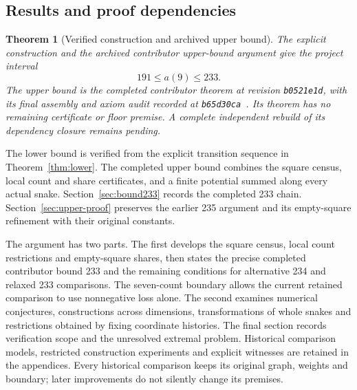 \documentclass[11pt,a4paper]{article}
\newtheorem{theorem}{Theorem}[section]
\theoremstyle{definition}
\theoremstyle{remark}
\begin{document}
\subsection{Results and proof dependencies}
\begin{theorem}[Verified construction and archived upper bound]\label{thm:main}
The explicit construction and the archived contributor upper-bound argument
give the project interval
\[
\boxed{191\le a(9)\le233.}
\]
The upper bound is the completed contributor theorem at revision
\texttt{b0521e1d}, with its final assembly and axiom audit recorded at
\texttt{b65d30ca}~\cite{bound233archive}. Its theorem has no remaining
certificate or floor premise. A complete independent rebuild of its
dependency closure remains pending.
\end{theorem}
The lower bound is verified from the explicit transition sequence in
Theorem~\ref{thm:lower}. The completed upper bound combines the square
census, local count and share certificates, and a finite potential summed
along every actual snake. Section~\ref{sec:bound233} records the completed
233 chain. Section~\ref{sec:upper-proof} preserves the earlier 235 argument
and its empty-square refinement with their original constants.

The argument has two parts. The first develops the square census,
local count restrictions and empty-square shares, then states the precise
completed contributor bound 233 and the remaining conditions for
alternative 234 and relaxed 233 comparisons. The seven-count boundary
allows the current retained comparison to use nonnegative loss alone.
The second examines numerical conjectures, constructions across
dimensions, transformations of whole snakes and restrictions obtained
by fixing coordinate histories. The final section records verification
scope and the unresolved extremal problem. Historical comparison models,
restricted construction experiments and explicit witnesses are retained
in the appendices. Every historical comparison keeps its original graph,
weights and boundary; later improvements do not silently change its premises.
\end{document}
